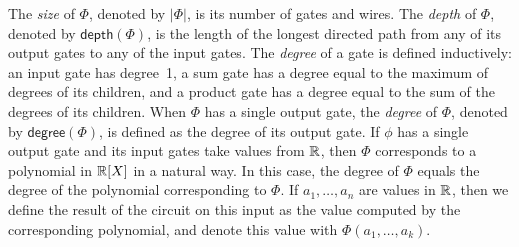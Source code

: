 The \textit{size} of $\Phi$, denoted by $|\Phi|$, is its number of gates and wires. The \textit{depth} of $\Phi$, denoted
by $\mathsf{depth}(\Phi)$, is the length of the longest directed path from any of its output gates to any of the input gates. The \textit{degree} of a gate is defined inductively: an input gate has degree~1, a sum gate has a degree equal to the maximum of degrees of its children, and a product gate has a degree equal to the sum of the degrees of its children. When $\Phi$ has a single output gate, the \textit{degree} of $\Phi$, denoted by $\mathsf{degree}(\Phi)$, is defined as the degree of its output gate. If $\phi$ has a single output gate and its input gates take values from $\mathbb{R}$, then $\Phi$ corresponds to a polynomial in $\mathbb{R}[X]$ in a natural way. In this case, the {degree} of $\Phi$ equals the degree of the polynomial corresponding to $\Phi$.
%
If $a_1,\ldots ,a_n$ are values in $\mathbb{R}$, then we define the result of the circuit on this input as the value computed by the corresponding polynomial, and denote this value with $\Phi(a_1,\ldots ,a_k)$.


%
%

